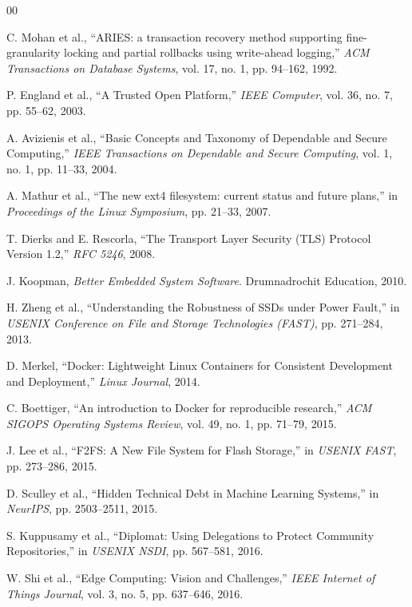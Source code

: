 \documentclass[conference]{IEEEtran}
\begin{document}
\begin{thebibliography}{00}

 C. Mohan et al., ``ARIES: a transaction recovery method supporting fine-granularity locking and partial rollbacks using write-ahead logging,'' \textit{ACM Transactions on Database Systems}, vol. 17, no. 1, pp. 94--162, 1992.

 P. England et al., ``A Trusted Open Platform,'' \textit{IEEE Computer}, vol. 36, no. 7, pp. 55--62, 2003.

 A. Avizienis et al., ``Basic Concepts and Taxonomy of Dependable and Secure Computing,'' \textit{IEEE Transactions on Dependable and Secure Computing}, vol. 1, no. 1, pp. 11--33, 2004.

 A. Mathur et al., ``The new ext4 filesystem: current status and future plans,'' in \textit{Proceedings of the Linux Symposium}, pp. 21--33, 2007.

 T. Dierks and E. Rescorla, ``The Transport Layer Security (TLS) Protocol Version 1.2,'' \textit{RFC 5246}, 2008.

 J. Koopman, \textit{Better Embedded System Software}. Drumnadrochit Education, 2010.

 H. Zheng et al., ``Understanding the Robustness of SSDs under Power Fault,'' in \textit{USENIX Conference on File and Storage Technologies (FAST)}, pp. 271--284, 2013.

 D. Merkel, ``Docker: Lightweight Linux Containers for Consistent Development and Deployment,'' \textit{Linux Journal}, 2014.

 C. Boettiger, ``An introduction to Docker for reproducible research,'' \textit{ACM SIGOPS Operating Systems Review}, vol. 49, no. 1, pp. 71--79, 2015.

 J. Lee et al., ``F2FS: A New File System for Flash Storage,'' in \textit{USENIX FAST}, pp. 273--286, 2015.

 D. Sculley et al., ``Hidden Technical Debt in Machine Learning Systems,'' in \textit{NeurIPS}, pp. 2503--2511, 2015.

 S. Kuppusamy et al., ``Diplomat: Using Delegations to Protect Community Repositories,'' in \textit{USENIX NSDI}, pp. 567--581, 2016.

 W. Shi et al., ``Edge Computing: Vision and Challenges,'' \textit{IEEE Internet of Things Journal}, vol. 3, no. 5, pp. 637--646, 2016.


\end{thebibliography}
\end{document}
